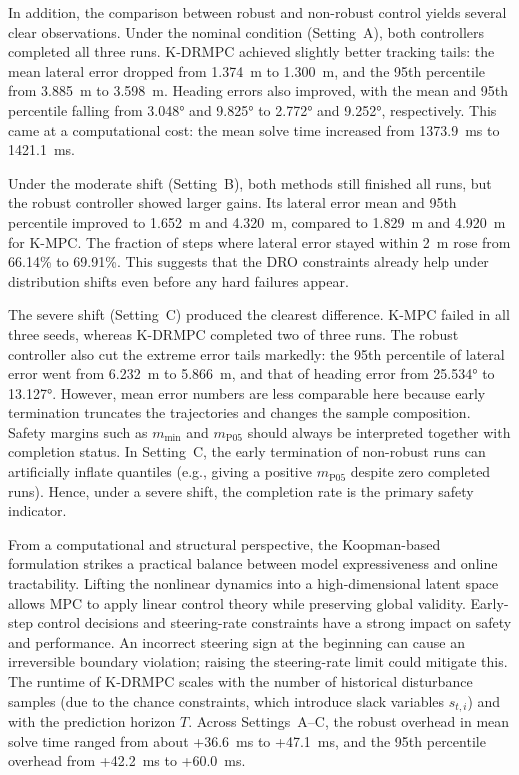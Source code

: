 \documentclass[pdflatex,sn-mathphys,Numbered]{sn-jnl}
\numberwithin{equation}{section}
\begin{document}
In addition, the comparison between robust and non-robust control yields several clear observations. Under the nominal condition (Setting~A), both controllers completed all three runs. K-DRMPC achieved slightly better tracking tails: the mean lateral error dropped from 1.374~m to 1.300~m, and the 95th percentile from 3.885~m to 3.598~m. Heading errors also improved, with the mean and 95th percentile falling from 3.048° and 9.825° to 2.772° and 9.252°, respectively. This came at a computational cost: the mean solve time increased from 1373.9~ms to 1421.1~ms.

Under the moderate shift (Setting~B), both methods still finished all runs, but the robust controller showed larger gains. Its lateral error mean and 95th percentile improved to 1.652~m and 4.320~m, compared to 1.829~m and 4.920~m for K-MPC. The fraction of steps where lateral error stayed within 2~m rose from 66.14\% to 69.91\%. This suggests that the DRO constraints already help under distribution shifts even before any hard failures appear.

The severe shift (Setting~C) produced the clearest difference. K-MPC failed in all three seeds, whereas K-DRMPC completed two of three runs. The robust controller also cut the extreme error tails markedly: the 95th percentile of lateral error went from 6.232~m to 5.866~m, and that of heading error from 25.534° to 13.127°. However, mean error numbers are less comparable here because early termination truncates the trajectories and changes the sample composition. Safety margins such as $m_{\min}$ and $m_{\mathrm{P05}}$ should always be interpreted together with completion status. In Setting~C, the early termination of non-robust runs can artificially inflate quantiles (e.g., giving a positive $m_{\mathrm{P05}}$ despite zero completed runs). Hence, under a severe shift, the completion rate is the primary safety indicator.

From a computational and structural perspective, the Koopman-based formulation strikes a practical balance between model expressiveness and online tractability. Lifting the nonlinear dynamics into a high-dimensional latent space allows MPC to apply linear control theory while preserving global validity. Early-step control decisions and steering-rate constraints have a strong impact on safety and performance. An incorrect steering sign at the beginning can cause an irreversible boundary violation; raising the steering-rate limit could mitigate this. The runtime of K-DRMPC scales with the number of historical disturbance samples (due to the chance constraints, which introduce slack variables $s_{t,i}$) and with the prediction horizon $T$. Across Settings~A–C, the robust overhead in mean solve time ranged from about +36.6~ms to +47.1~ms, and the 95th percentile overhead from +42.2~ms to +60.0~ms.
	
\end{document}
